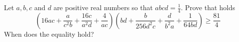 Let $a, b, c$ and $d$ are positive real numbers so that $abcd = \frac14$. Prove that holds
$$\left( 16ac +\frac{a}{c^2b}+\frac{16c}{a^2d}+\frac{4}{ac}\right)\left( bd +\frac{b}{256d^2c}+\frac{d}{b^2a}+\frac{1}{64bd}\right) \ge \frac{81}{4}$$When does the equality hold?